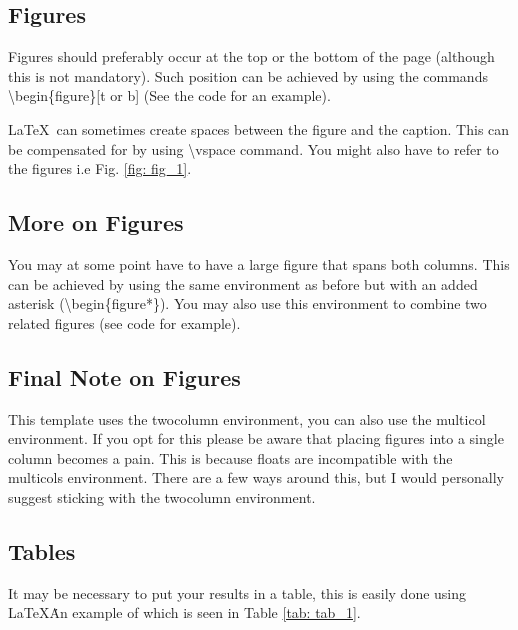\documentclass[a4paper,twocolumn,12pt, notitlepage]{article}
\begin{document}
\subsection{Figures}
Figures should preferably occur at the top or the bottom of the page (although this is not mandatory). Such position can be achieved by using the commands \textbackslash begin\{figure\}[t or b] (See the code for an example).  


\LaTeX\ can sometimes create spaces between the figure and the caption. This can be compensated for by using \textbackslash vspace command. You might also have to refer to the figures i.e Fig. \ref{fig: fig_1}.

\vspace{-5mm}

\subsection{More on Figures}
You may at some point have to have a large figure that spans both columns. This can be achieved by using the same environment as before but with an added asterisk (\textbackslash begin\{figure*\}). You may also use this environment to combine two related figures (see code for example).

\subsection{Final Note on Figures}
This template uses the twocolumn environment, you can also use the multicol environment. If you opt for this please be aware that placing figures into a single column becomes a pain. This is because floats are incompatible with the multicols environment. There are a few ways around this, but I would personally suggest sticking with the twocolumn environment.

\subsection{Tables}
\label{table}
It may be necessary to put your results in a table, this is easily done using \LaTeX\. An example of which is seen in Table \ref{tab: tab_1}.
\end{document}
